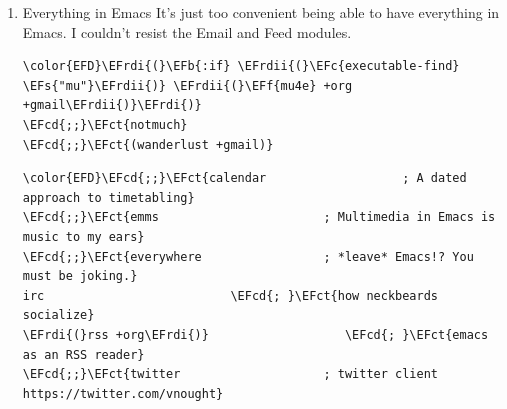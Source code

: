 \documentclass{scrartcl}
\newcommand{\EFs}[1]{\textcolor{EFs}{#1}} %
\newcommand{\EFb}[1]{\textcolor{EFb}{#1}} %
\newcommand{\EFct}[1]{\textcolor{EFct}{#1}} %
\newcommand{\EFc}[1]{\textcolor{EFc}{#1}} %
\newcommand{\EFf}[1]{\textcolor{EFf}{#1}} %
\newcommand{\EFcd}[1]{\textcolor{EFcd}{#1}} %
\newcommand{\EFrdi}[1]{\textcolor{EFrdi}{#1}} %
\newcommand{\EFrdii}[1]{\textcolor{EFrdii}{#1}} %
\begin{document}
\begin{enumerate}
\begin{Code}
\begin{Verbatim}[]
\EFcd{;;}\EFct{raku                       ; the artist formerly known as perl6}
\EFcd{;;}\EFct{rest                       ; Emacs as a REST client}
\EFcd{;;}\EFct{rst                        ; ReST in peace}
\EFcd{;;}\EFct{(ruby +rails)              ; 1.step \{|i| p "Ruby is \#\{i.even? ? 'love' : 'life'\}"\}}
\EFrdi{(}rust +lsp\EFrdi{)}                  \EFcd{; }\EFct{Fe2O3.unwrap().unwrap().unwrap().unwrap()}
\EFcd{;;}\EFct{scala                      ; java, but good}
\EFcd{;;}\EFct{scheme                     ; a fully conniving family of lisps}
\EFcd{;;}\EFct{sh                         ; she sells \{ba,z,fi\}sh shells on the C xor}
\EFcd{;;}\EFct{sml                        ; no, the /other/ ML}
\EFcd{;;}\EFct{solidity                   ; do you need a blockchain? No.}
\EFcd{;;}\EFct{swift                      ; who asked for emoji variables?}
\EFcd{;;}\EFct{terra                      ; Earth and Moon in alignment for performance.}
\EFcd{;;}\EFct{web                        ; the tubes}
\EFcd{;;}\EFct{yaml                       ; JSON, but readable}
\EFcd{;;}\EFct{zig                        ; C, but simpler}
\end{Verbatim}
\end{Code}

\item Everything in Emacs
\label{sec:org05e804b}
It's just too convenient being able to have everything in Emacs.
I couldn't resist the Email and Feed modules.

\begin{Code}
\begin{Verbatim}[]
\color{EFD}\EFrdi{(}\EFb{:if} \EFrdii{(}\EFc{executable-find} \EFs{"mu"}\EFrdii{)} \EFrdii{(}\EFf{mu4e} +org +gmail\EFrdii{)}\EFrdi{)}
\EFcd{;;}\EFct{notmuch}
\EFcd{;;}\EFct{(wanderlust +gmail)}
\end{Verbatim}
\end{Code}

\begin{Code}
\begin{Verbatim}[]
\color{EFD}\EFcd{;;}\EFct{calendar                   ; A dated approach to timetabling}
\EFcd{;;}\EFct{emms                       ; Multimedia in Emacs is music to my ears}
\EFcd{;;}\EFct{everywhere                 ; *leave* Emacs!? You must be joking.}
irc                          \EFcd{; }\EFct{how neckbeards socialize}
\EFrdi{(}rss +org\EFrdi{)}                   \EFcd{; }\EFct{emacs as an RSS reader}
\EFcd{;;}\EFct{twitter                    ; twitter client https://twitter.com/vnought}
\end{Verbatim}
\end{Code}
\end{enumerate}
\end{document}
